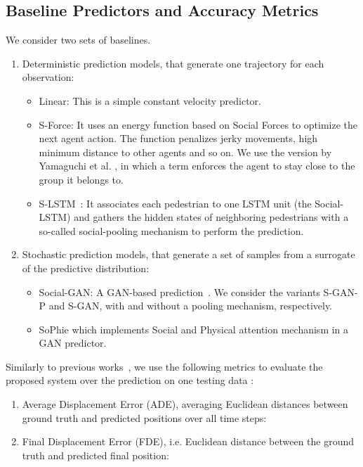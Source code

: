 \documentclass[10pt,twocolumn,letterpaper]{article}
\begin{document}
\subsection{Baseline Predictors and Accuracy Metrics}
We consider two sets of baselines.
\begin{enumerate}[leftmargin=*]
\item Deterministic prediction models, that generate one trajectory for each observation:

\begin{itemize}[leftmargin=*]
	\item Linear: This is a simple constant velocity predictor.

	\item S-Force: It uses an energy function based on Social Forces to optimize the next agent action. The function penalizes jerky movements, high minimum distance to other agents and so on. We use the version by Yamaguchi et al. \cite{Yamaguchi2011}, in which a term enforces the agent to stay close to the group it belongs to.
	
	\item S-LSTM~\cite{SocialLSTM2016}: It associates each pedestrian to one LSTM unit (the Social-LSTM) and gathers the hidden states of neighboring pedestrians with a so-called social-pooling mechanism to perform the prediction.

\end{itemize}


\item Stochastic prediction models, that generate a set of samples from a surrogate of the predictive distribution:

\begin{itemize}[leftmargin=*]
	\item Social-GAN: A GAN-based prediction~\cite{SocialGAN2018}. We consider the variants S-GAN-P and S-GAN, with and without a pooling mechanism, respectively.
	
	\item SoPhie \cite{SoPhie2018} which implements Social and Physical attention mechanism in a GAN predictor.
\end{itemize}
\end{enumerate}
Similarly to previous works~\cite{SocialGAN2018, SocialAttention2018Vemula}, we use the following metrics to evaluate the proposed system over the prediction on one testing data :
\begin{enumerate}[leftmargin=*]
\item Average Displacement Error (ADE), averaging Euclidean distances between ground truth and predicted positions over all time steps: 
\vspace{-0.2cm}
{\small}
\item Final Displacement Error (FDE), i.e. Euclidean distance between the ground truth and predicted final position: 
{\small}
\end{enumerate}
\end{document}
